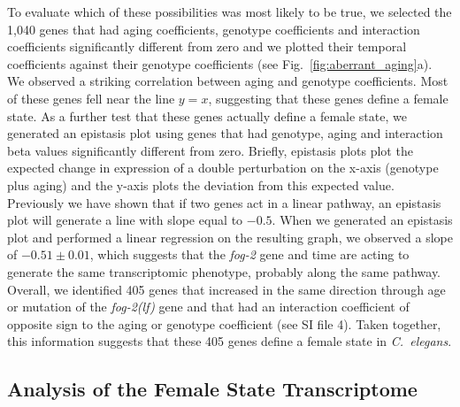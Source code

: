 \documentclass[10pt,letterpaper,twocolumn]{article}
\newcommand{\cel}{\emph{C.~elegans}}
\newcommand{\fog}{\emph{\mbox{fog-2(lf)}}}
\newcommand{\gene}[1]{\emph{\mbox{#1}}}
\newcommand{\intersectn}{1,040}
\newcommand{\femalen}{405}
\begin{document}
To evaluate which of these possibilities was most likely to be true, we selected
the \intersectn{} genes that had aging coefficients, genotype coefficients and
interaction coefficients significantly different from zero and we plotted their
temporal coefficients against their genotype coefficients (see
Fig.~\ref{fig:aberrant_aging}a). We observed a striking correlation between
aging and genotype coefficients. Most of these genes fell near the line $y=x$,
suggesting that these genes define a female state. As a further test that these
genes actually define a female state, we generated an epistasis plot using genes
that had genotype, aging and interaction beta values significantly different
from zero.
Briefly, epistasis plots plot the expected change in expression of a double
perturbation on the x-axis (genotype plus aging) and the y-axis plots the deviation
from this expected value. Previously we have shown that if two genes act in a
linear pathway, an epistasis plot will generate a line with slope equal to $-0.5$.
When we generated an epistasis plot and performed a linear regression on the
resulting graph, we observed a slope of $-0.51\pm 0.01$, which suggests that the
\gene{fog-2} gene and time are acting to generate the same transcriptomic phenotype,
probably along the same pathway.
Overall, we identified
\femalen{} genes that increased in the same direction through age or mutation
of the \fog{} gene and that had an interaction coefficient of opposite sign to
the aging or genotype coefficient (see SI file 4). Taken together, this
information suggests that these \femalen{} genes define a female state in
\cel{}.

\subsection*{Analysis of the Female State Transcriptome}
\end{document}
